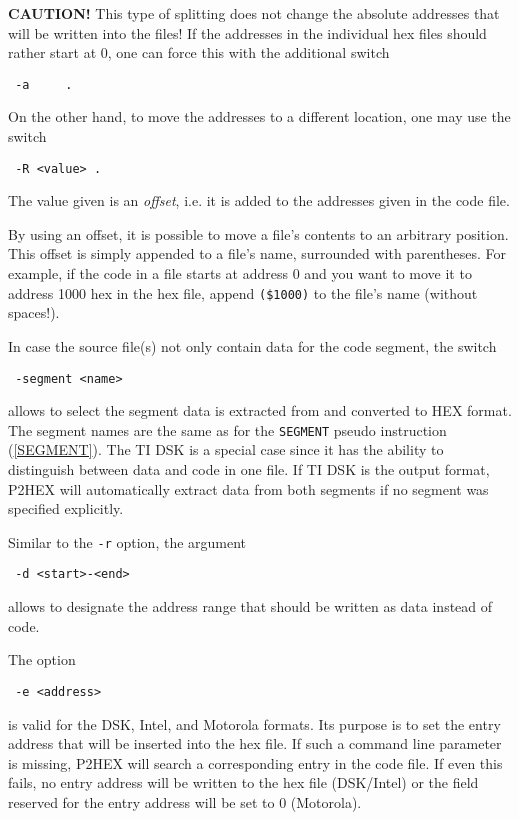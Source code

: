 \documentclass[12pt,twoside]{report}
\newcommand{\bb}[1]{{\bf #1}}
\newcommand{\tty}[1]{{\tt #1}}
\begin{document}
\bb{CAUTION!} This type of splitting does not change the absolute
addresses that will be written into the files!  If the addresses in
the individual hex files should rather start at 0, one can force this
with the additional switch
\begin{verbatim}
 -a     .
\end{verbatim}
On the other hand, to move the addresses to a different location, one may
use the switch
\begin{verbatim}
 -R <value> .
\end{verbatim}
The value given is an {\em offset}, i.e. it is added to the addresses
given in the code file.
\par
By using an offset, it is possible to move a file's contents to an
arbitrary position.  This offset is simply appended to a file's name,
surrounded with parentheses.  For example, if the code in a file
starts at address 0 and you want to move it to address 1000 hex in the
hex file, append \tty{(\$1000)} to the file's name (without spaces!).
\par
In case the source file(s) not only contain data for the code segment,
the switch
\begin{verbatim}
 -segment <name>
\end{verbatim}
allows to select the segment data is extracted from and converted to
HEX format.  The segment names are the same as for the \tty{SEGMENT}
pseudo instruction (\ref{SEGMENT}).  The TI DSK is a special case
since it has the ability to distinguish between data and code in one
file.  If TI DSK is the output format, P2HEX will automatically
extract data from both segments if no segment was specified explicitly.
\par
Similar to the \verb!-r! option, the argument
\begin{verbatim}
 -d <start>-<end>
\end{verbatim}
allows to designate the address range that should be written as data
instead of code.
\par
The option
\begin{verbatim}
 -e <address>
\end{verbatim}
is valid for the DSK, Intel, and Motorola formats.  Its purpose is to
set the entry address that will be inserted into the hex file.  If
such a command line parameter is missing, P2HEX will search a
corresponding entry in the code file.  If even this fails, no entry
address will be written to the hex file (DSK/Intel) or the field
reserved for the entry address will be set to 0 (Motorola).
\end{document}
